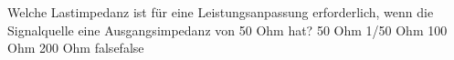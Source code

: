     {Welche Lastimpedanz ist für eine Leistungsanpassung erforderlich, wenn die Signalquelle eine Ausgangsimpedanz von 50 Ohm hat? }
    {50 Ohm}
    {1/50 Ohm}
    {100 Ohm}
    {200 Ohm}
    {false}{false}